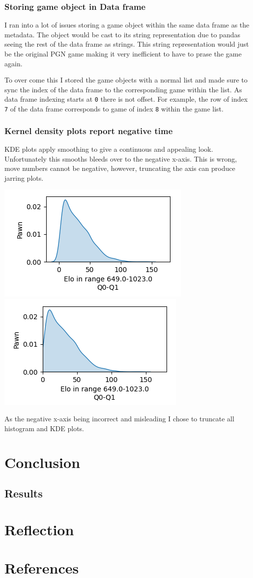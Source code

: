 \documentclass[11pt]{article}
\begin{document}
\subsubsection{Storing game object in Data frame}
\label{sec:org02f7487}
I ran into a lot of issues storing a game object within the same data frame as the metadata. The object would be cast to its string representation due to pandas seeing the rest of the data frame as strings. This string representation would just be the original PGN game making it very inefficient to have to prase the game again.

To over come this I stored the game objects with a normal list and made sure to sync the index of the data frame to the corresponding game within the list. As data frame indexing starts at \texttt{0} there is not offset. For example, the row of index \texttt{7} of the data frame corresponds to game of index \texttt{8} within the game list.
\subsubsection{Kernel density plots report negative time}
\label{sec:orgdd8392d}
KDE plots apply smoothing to give a continuous and appealing look. Unfortunately this smooths bleeds over to the negative x-axis. This is wrong, move numbers cannot be negative, however, truncating the axis can produce jarring plots.
\begin{center}
\includegraphics[height=0.2\textwidth]{images/KDE negative values.png}
\includegraphics[height=0.2\textwidth]{images/KDE bad smoothing.png}
\end{center}

As the negative x-axis being incorrect and misleading I chose to truncate all histogram and KDE plots.
\section{Conclusion}
\label{sec:orga97ea47}
\subsection{Results}
\label{sec:orgf84b4f2}
\section{Reflection}
\label{sec:org5fc0047}
\section{References}
\label{sec:org9f5945b}


\end{document}
